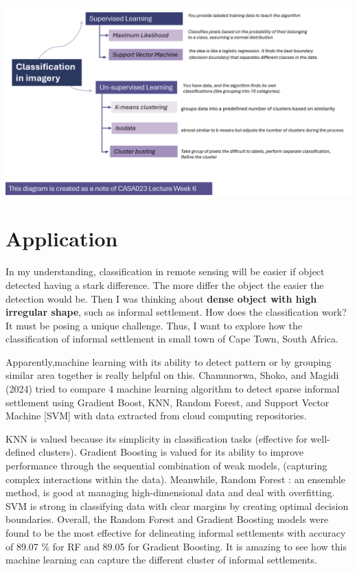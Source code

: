 \documentclass[
  letterpaper,
  DIV=11,
  numbers=noendperiod]{scrreprt}
\begin{document}
\includegraphics[width=6.73958in,height=\textheight]{images/clipboard-3670863260.png}

\hypertarget{application-4}{%
\section{Application}\label{application-4}}

In my understanding, classification in remote sensing will be easier if
object detected having a stark difference. The more differ the object
the easier the detection would be. Then I was thinking about
\textbf{dense object with high irregular shape}, such as informal
settlement. How does the classification work? It must be posing a unique
challenge. Thus, I want to explore how the classification of informal
settlement in small town of Cape Town, South Africa.

Apparently,machine learning with its ability to detect pattern or by
grouping similar area together is really helpful on this. Chamunorwa,
Shoko, and Magidi (2024) tried to compare 4 machine learning algorithm
to detect sparse informal settlement using Gradient Boost, KNN, Random
Forest, and Support Vector Machine {[}SVM{]} with data extracted from
cloud computing repositories.

KNN is valued because its simplicity in classification tasks (effective
for well-defined clusters). Gradient Boosting is valued for its ability
to improve performance through the sequential combination of weak
models, (capturing complex interactions within the data). Meanwhile,
Random Forest : an ensemble method, is good at managing high-dimensional
data and deal with overfitting. SVM is strong in classifying data with
clear margins by creating optimal decision boundaries. Overall, the
Random Forest and Gradient Boosting models were found to be the most
effective for delineating informal settlements with accuracy of 89.07 \%
for RF and 89.05 for Gradient Boosting. It is amazing to see how this
machine learning can capture the different cluster of informal
settlements.
\end{document}
